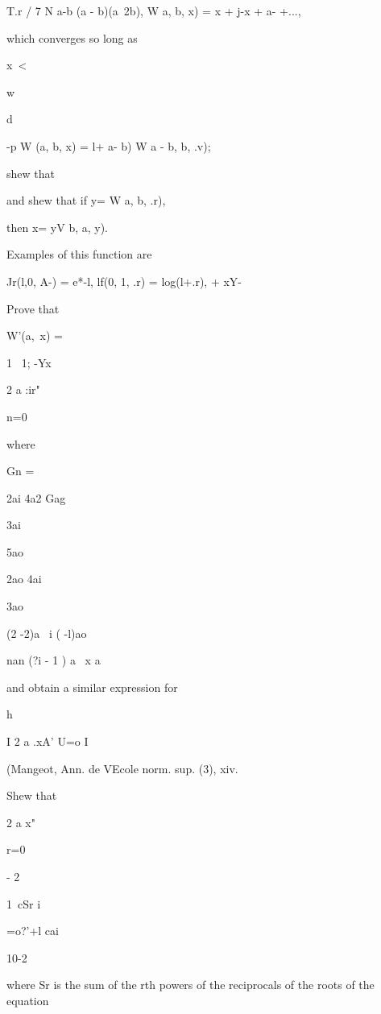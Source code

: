 \begin{wandwmiscexamples}
\begin{wandwmiscexample}
    T.r / 7 N a-b (a - b)(a~2b), W a, b, x) = x + j-x + a- +...,

    which converges so long as

    x\ <

    w

    d

    -p W (a, b, x) = l+ a- b) W a - b, b, .v);

    shew that

    and shew that if y= W a, b, .r),

    then x= yV b, a, y).

    Examples of this function are

    Jr(l,0, A-) = e*-l, lf(0, 1, .r) = log(l+.r), + xY-\
  \end{wandwmiscexample}
  \begin{wandwmiscexample}
    Prove that

    W'(a, \,x) =

    1 \ 1; -Yx


    2 a :ir"

    n=0

    where

    Gn =

    2ai 4a2 Gag

    3ai

    5ao

    2ao 4ai

    3ao

    (2 -2)a \ i ( -l)ao

    nan (?i - 1 ) a \ x a

    and obtain a similar expression for

    h

    I 2 a .xA' U=o I

    (Mangeot, Ann. de VEcole norm. sup. (3), xiv.
  \end{wandwmiscexample}
  \begin{wandwmiscexample}
    Shew that

    2 a x"

    r=0

    - 2

    1\ cSr i

    =o?'+l cai

    10-2


    where Sr is the sum of the rth powers of the reciprocals of the roots
    of the equation


\end{wandwmiscexample}
\end{wandwmiscexamples}
